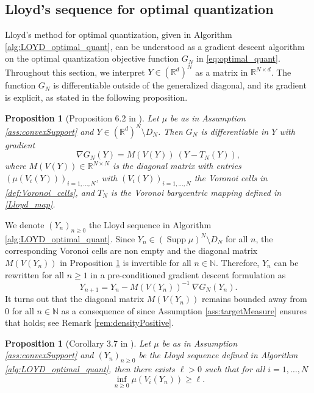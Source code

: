 \documentclass[11pt]{article}
\DeclareMathOperator{\supp}{Supp}
\newcommand{\N}{\mathbb N}
\newcommand{\R}{\mathbb R}
\newcommand{\1}{\mathbbm{1}}
\newtheorem{prop}[lem]{Proposition}
\numberwithin{equation}{section}
\begin{document}
\subsection{Lloyd's sequence for optimal quantization}
\label{sec:optimal_quantization}
Lloyd's method for optimal quantization, given in Algorithm \ref{alg:LOYD_optimal_quant}, can be understood as a gradient descent algorithm on the optimal quantization objective function $G_N$ in \eqref{eq:optimal_quant}. Throughout this section, we interpret $Y\in (\mathbb{R}^{d})^{N}$ as a matrix in $\R^{N \times d}$.
The function $G_N$ is differentiable outside of the generalized diagonal, and its gradient is explicit, as stated in the following proposition.
\begin{prop}[Proposition 6.2 in \cite{Lloydoptcvonedimlogconcave2}]
	Let $\mu$ be as in Assumption \ref{ass:convexSupport} and $Y\in (\mathbb{R}^{d})^{N}\setminus D_{N}$. Then $G_{N}$ is differentiable in $Y$ with gradient
    \begin{equation}
        \nabla G_{N}(Y)=M(V(Y))\ (Y-T_N(Y)),
        \label{eq:grad_GN}
    \end{equation}
	where $M(V(Y)) \in \R^{N \times N}$ is the diagonal matrix with entries $(\mu(V_i(Y)))_{i=1,\ldots,N}$, with $(V_i(Y))_{i=1,\ldots,N}$ the Voronoi cells in \eqref{def:Voronoi_cells}, and $T_N$ is the Voronoi barycentric mapping defined in \eqref{Lloyd_map}.
	\label{prop:lloydOptimalGradient}
\end{prop}
We denote $(Y_n)_{n\geq 0}$ the Lloyd sequence in Algorithm \ref{alg:LOYD_optimal_quant}. Since $Y_n \in (\supp \mu)^N \setminus D_N$ for all $n$, the corresponding Voronoi cells are non empty and the diagonal matrix $M(V(Y_n))$ in Proposition \ref{prop:lloydOptimalGradient} is invertible for all $n \in \N$. Therefore, $Y_n$ can be rewritten for all $n\geq 1$ in a pre-conditioned gradient descent formulation as 
\begin{equation}\label{LloydCVT_algo_2}
	Y_{n+1}=Y_{n}-M(V(Y_{n}))^{-1}\  \nabla G_{N}(Y_{n}).
\end{equation}
It turns out that the diagonal matrix $M(V(Y_n))$ remains bounded away from $0$ for all $n \in \N$ as a consequence of \cite[Theorem 3.6]{nondegeneracyLloyd} since Assumption \ref{ass:targetMeasure} ensures that \cite[Assumption 3.1]{nondegeneracyLloyd} holds; see Remark \ref{rem:densityPositive}.
\begin{prop}[Corollary 3.7 in \cite{nondegeneracyLloyd}]
	Let $\mu$ be as in Assumption \ref{ass:convexSupport} and $(Y_{n})_{n\geq 0}$ be the Lloyd sequence defined in Algorithm \ref{alg:LOYD_optimal_quant}, then there exists $\ell>0$ such that for all $i=1,\ldots,N$
	\begin{equation}
	    \label{eq:mu_bounded}
	    \inf_{n\geq 0} \mu(V_{i}(Y_{n}))\geq \ell.
	\end{equation}	
	\label{prop:muBounded}
\end{prop}
\end{document}
